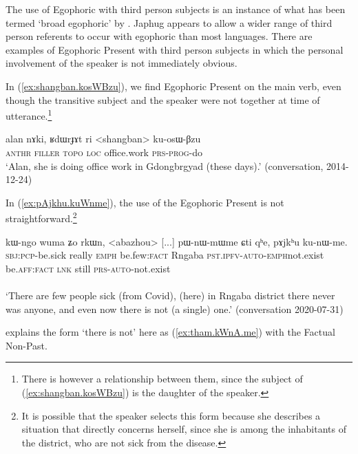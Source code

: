The use of Egophoric with third person subjects is an instance of what has been termed `broad egophoric' by \citep[89]{gawne17bodish}. Japhug appears to allow a wider range of third person referents to occur with egophoric than most languages. There are examples of Egophoric Present with third person subjects in which the personal involvement of the speaker is not immediately obvious.



In (\ref{ex:shangban.kosWBzu}), we find Egophoric Present on the main verb, even though the transitive subject and the speaker were not together at time of utterance.\footnote{There is however a relationship between them, since the subject of (\ref{ex:shangban.kosWBzu}) is the daughter of the speaker. }


\begin{exe}
	\ex \label{ex:shangban.kosWBzu}
	\gll alan nɤki, ʁdɯrɟɤt ri <shangban> ku-osɯ-βzu \\
	\textsc{anthr} \textsc{filler}  \textsc{topo} \textsc{loc} office.work \textsc{prs}-\textsc{prog}-do \\
	\glt `Alan, she is doing office work in Gdongbrgyad (these days).' (conversation, 2014-12-24)
\end{exe}

In (\ref{ex:pAjkhu.kuWnme}), the use of the Egophoric Present is not straightforward.\footnote{It is possible that the speaker selects this form because she describes a situation that directly concerns herself, since she is among the inhabitants of the district, who are not sick from the disease. }

\begin{exe}
	\ex \label{ex:pAjkhu.kuWnme}
	\gll kɯ-ngo wuma ʑo rkɯn, <abazhou> [...] pɯ-nɯ-mɯ\redp{}me ɕti qʰe, pɤjkʰu ku-nɯ-me. \\
	\textsc{sbj}:\textsc{pcp}-be.sick really \textsc{emph} be.few:\textsc{fact} Rngaba {  } \textsc{pst}.\textsc{ipfv}-\textsc{auto}-\textsc{emph}\redp{}not.exist be.\textsc{aff}:\textsc{fact} \textsc{lnk} still \textsc{prs}-\textsc{auto}-not.exist \\
	\\
	\glt `There are few people sick (from Covid), (here) in Rngaba district there never was anyone, and even now there is not (a single) one.' 	(conversation 2020-07-31)
\end{exe}

 explains the form  `there is not' here as (\ref{ex:tham.kWnA.me}) with the Factual Non-Past.
 
